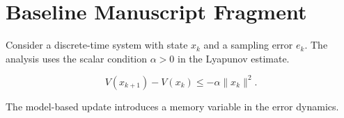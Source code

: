 \documentclass{article}
\begin{document}
\section{Baseline Manuscript Fragment}

Consider a discrete-time system with state $x_k$ and a sampling error $e_k$.
The analysis uses the scalar condition $\alpha>0$ in the Lyapunov estimate.

\[
  V(x_{k+1})-V(x_k)\leq -\alpha\|x_k\|^2.
\]

The model-based update introduces a memory variable in the error dynamics.
\end{document}
